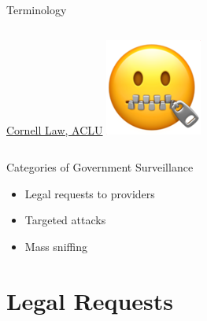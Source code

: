 \documentclass[nobackground,dvipsnames,table]{beamer}
\begin{document}
\begin{frame}{Terminology}
\begin{columns}[T]
            \scriptsize
            \href{https://www.law.cornell.edu/wex/surveillance}{Cornell Law, }\href{https://www.aclu.org/other/what-censorship}{ACLU}
            \includegraphics[width=\textwidth]{zipped}
    \end{columns}
\end{frame}

\begin{frame}{Categories of Government Surveillance}
    \begin{itemize}
        \item Legal requests to providers
        \item Targeted attacks
        \item Mass sniffing
    \end{itemize}
\end{frame}

\section{Legal Requests}

\begin{frame}{}
    \thispagestyle{empty}
\end{frame}
\end{document}
